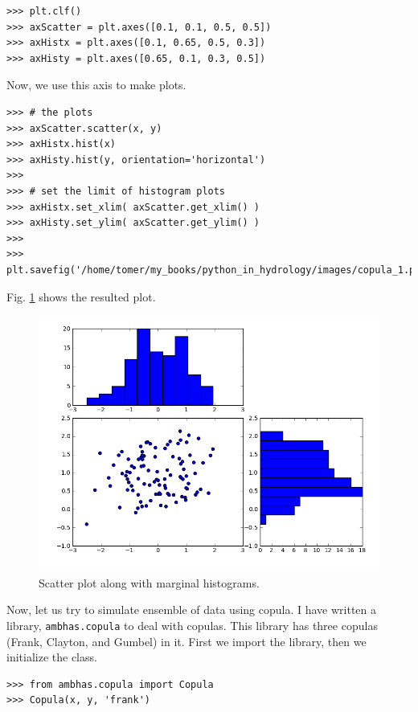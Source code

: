 \documentclass[10pt]{book}
\begin{document}
{\beforeverb \begin{verbatim}
>>> plt.clf()
>>> axScatter = plt.axes([0.1, 0.1, 0.5, 0.5])
>>> axHistx = plt.axes([0.1, 0.65, 0.5, 0.3])
>>> axHisty = plt.axes([0.65, 0.1, 0.3, 0.5])
\end{verbatim} \afterverb

Now, we use this axis to make plots. 
\beforeverb \begin{verbatim}
>>> # the plots
>>> axScatter.scatter(x, y)
>>> axHistx.hist(x)
>>> axHisty.hist(y, orientation='horizontal')
>>> 
>>> # set the limit of histogram plots
>>> axHistx.set_xlim( axScatter.get_xlim() )
>>> axHisty.set_ylim( axScatter.get_ylim() )
>>> 
>>> plt.savefig('/home/tomer/my_books/python_in_hydrology/images/copula_1.png')
\end{verbatim} \afterverb

Fig. \ref{fig:copula1} shows the resulted plot. 
\beforefig
\begin{figure}[h!]
  \centering
    \includegraphics[scale=0.5]{images/copula_1.png}
  \caption{Scatter plot along with marginal histograms.}
   \label{fig:copula1}
\end{figure}
\afterfig

Now, let us try to simulate ensemble of data using copula. I have written a library, \verb"ambhas.copula" to deal with copulas. This library has three copulas (Frank, Clayton, and Gumbel) in it. First we import the library, then we initialize the class. 

\beforeverb \begin{verbatim}
>>> from ambhas.copula import Copula
>>> Copula(x, y, 'frank')
\end{verbatim} \afterverb

}
\end{document}
